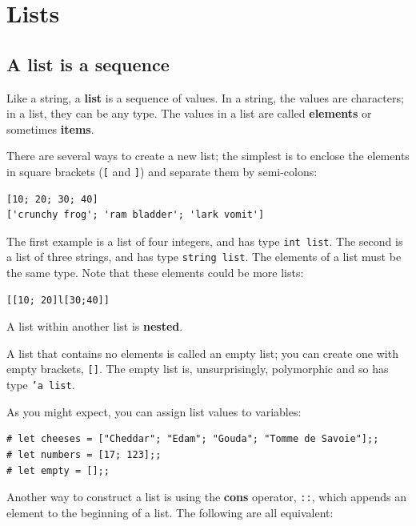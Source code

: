\documentclass[10pt]{book}
\begin{document}
\chapter{Lists}



\section{A list is a sequence}

Like a string, a {\bf list} is a sequence of values.  In a string, the
values are characters; in a list, they can be any type.  The values in
a list are called {\bf elements} or sometimes {\bf items}.


There are several ways to create a new list; the simplest is to
enclose the elements in square brackets (\verb"[" and \verb"]")
and separate them by semi-colons:

\beforeverb
\begin{verbatim}
[10; 20; 30; 40]
['crunchy frog'; 'ram bladder'; 'lark vomit']
\end{verbatim}
\afterverb
%
The first example is a list of four integers, and has type {\tt int list}.  The second is a list of
three strings, and has type {\tt string list}.  The elements of a list must be the same type. Note that
these elements could be more lists:

\beforeverb
\begin{verbatim}
[[10; 20]l[30;40]]
\end{verbatim}
\afterverb
%
A list within another list is {\bf nested}.


A list that contains no elements is
called an empty list; you can create one with empty
brackets, \verb"[]". The empty list is, unsurprisingly, polymorphic and so
has type {\tt 'a list}.


As you might expect, you can assign list values to variables:

\beforeverb
\begin{verbatim}
# let cheeses = ["Cheddar"; "Edam"; "Gouda"; "Tomme de Savoie"];;
# let numbers = [17; 123];;
# let empty = [];;
\end{verbatim}
\afterverb

Another way to construct a list is using the {\bf cons} operator, \verb"::", which
appends an element to the beginning of a list. The following are all equivalent:
\end{document}
